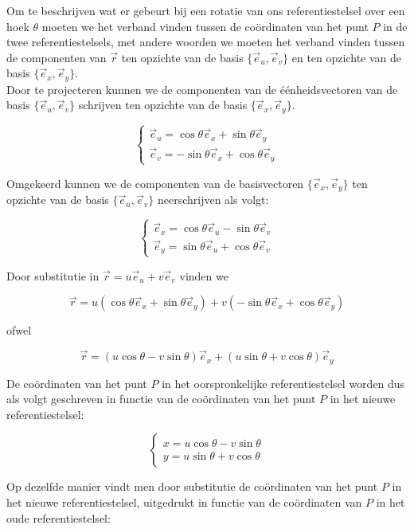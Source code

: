 Om te beschrijven wat er gebeurt bij een rotatie van ons referentiestelsel over een hoek $\theta$ moeten we het verband vinden tussen de co\"{o}rdinaten van het punt $P$ in de twee referentiestelsels, met andere woorden we moeten het verband vinden tussen de componenten van $\vec{r}$ ten opzichte van de basis $\{\vec{e}_u ,\vec{e}_v \}$ en ten opzichte van de basis $\{\vec{e}_x ,\vec{e}_y \}$.\\ 

Door te projecteren kunnen we de componenten van de \'{e}\'{e}nheidsvectoren van de basis $\{\vec{e}_u ,\vec{e}_v \}$ schrijven ten opzichte van de basis $\{\vec{e}_x ,\vec{e}_y \}$.

\[  
\left \{ \begin{array}{l} 
\vec{e}_u =\cos \theta \vec{e}_x + \sin \theta \vec{e}_y \\
\vec{e}_v =-\sin \theta \vec{e}_x + \cos \theta \vec{e}_y
\end{array}  \right.
\]

Omgekeerd kunnen we de componenten van de basisvectoren $\{\vec{e}_x ,\vec{e}_y \}$ ten opzichte van de basis $\{\vec{e}_u ,\vec{e}_v \}$ neerschrijven als volgt:

\[  
\left \{ \begin{array}{l} 
\vec{e}_x =\cos \theta \vec{e}_u - \sin \theta \vec{e}_v \\
\vec{e}_y =\sin \theta \vec{e}_u + \cos \theta \vec{e}_v
\end{array}  \right.
\]

Door substitutie in $\vec{r}=u \vec{e}_u + v \vec{e}_v$ vinden we

\[ \vec{r}=u(\cos \theta \vec{e}_x + \sin \theta \vec{e}_y) + v(-\sin \theta \vec{e}_x + \cos \theta \vec{e}_y)  \]

ofwel

\[ \vec{r}=(u \cos \theta -v \sin \theta)\vec{e}_x + (u \sin \theta + v \cos \theta)\vec{e}_y \]

De co\"{o}rdinaten van het punt $P$ in het oorspronkelijke referentiestelsel worden dus als volgt geschreven in functie van de co\"{o}rdinaten van het punt $P$ in het nieuwe referentiestelsel:

\[   
\left\{ \begin{array}{l}
x= u \cos \theta -v \sin \theta \\
y= u \sin \theta + v \cos \theta \end{array} \right.
\]

Op dezelfde manier vindt men door substitutie de co\"{o}rdinaten van het punt $P$ in het nieuwe referentiestelsel, uitgedrukt in functie van de co\"{o}rdinaten van $P$ in het oude referentiestelsel:

